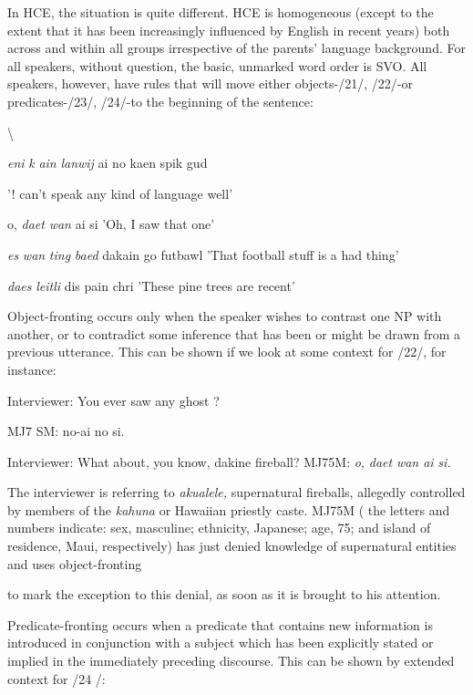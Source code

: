 In HCE, the situation is quite different. HCE is homogeneous (except to the extent that it has been increasingly influenced by English in recent years) both across and within all groups irrespective of the parents' language background. For all speakers, without question, the basic, unmarked word order is SVO. All speakers, however, have rules that will move either objects-/21/, /22/-or predicates-/23/, /24/-to the beginning of the sentence:

{\textbackslash}


\ea\label{ex:21}
 \textit{eni} \textit{k} \textit{ain} \textit{lanwij} ai no kaen spik gud
\glt
\z

'! can't speak any kind of language well'

\ea\label{ex:22}
 o, \textit{daet} \textit{wan} ai si 'Oh, I saw that one'
\glt
\z

\ea\label{ex:23}
 \textit{es} \textit{wan} \textit{ting} \textit{baed} dakain go futbawl 'That football stuff is a had thing'
\glt
\z

\ea\label{ex:24}
 \textit{daes} \textit{leitli} dis pain chri 'These pine trees are recent'
\glt
\z

Object-fronting occurs only when the speaker wishes to contrast one NP with another, or to contradict some inference that has been or might be drawn from a previous utterance. This can be shown if we look at some context for /22/, for instance:

\ea\label{ex:25}
 Interviewer: You ever saw any ghost ?
\glt
\z

MJ7 SM: no-ai no si.

Interviewer: What about, you know, dakine fireball? MJ75M: \textit{o,} \textit{daet} \textit{wan ai} \textit{si.}

The interviewer is referring to \textit{akualele,} supernatural fireballs, allegedly controlled by members of the \textit{kahuna} or Hawaiian priestly caste. MJ75M ( the letters and numbers indicate: sex, masculine; ethnicity, Japanese; age, 75; and island of residence, Maui, respectively) has just denied knowledge of supernatural entities and uses object-fronting

to mark the exception to this denial, as soon as it is brought to his attention.

Predicate-fronting occurs when a predicate that contains new information is introduced in conjunction with a subject which has been explicitly stated or implied in the immediately preceding discourse. This can be shown by extended context for /24 /:

